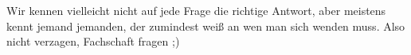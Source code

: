 Wir kennen vielleicht nicht auf jede Frage die richtige Antwort, aber meistens kennt jemand jemanden, der zumindest weiß an wen man sich wenden muss. Also nicht verzagen, Fachschaft fragen ;)